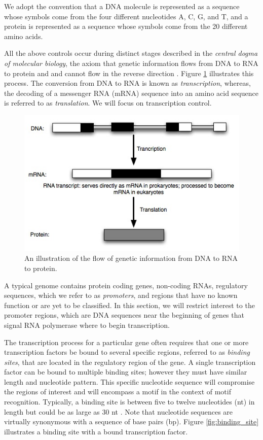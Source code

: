We adopt the convention that a DNA molecule is represented as a sequence whose symbols come from the four different nucleotides A, C, G, and T, and a protein is represented as a sequence whose symbols come from the 20 different amino acids. 
  
All the above controls occur during distinct stages described in the {\em central dogma of molecular biology}, the axiom that genetic information flows from DNA to RNA to protein and and cannot flow in the reverse direction \cite{crick}.  Figure \ref{fig:central_dogma} illustrates this process. The conversion from DNA to RNA is known as {\em transcription}, whereas, the decoding of a messenger RNA (mRNA) sequence into an amino acid sequence is referred to as {\em translation}.  We will focus on transcription control.  

\begin{figure}[h!]
\begin{center}
 \includegraphics[width=\linewidth]{images/central_dogma}
\caption{An illustration of the flow of genetic information from DNA to RNA to protein. }
\label{fig:central_dogma}
\end{center}
\end{figure}

A typical genome contains protein coding genes, non-coding RNAs, regulatory sequences, which we refer to as {\em promoters}, and regions that have no known function or are yet to be classified. In this section, we will restrict interest to the promoter regions, which are DNA sequences near the beginning of genes that signal RNA polymerase where to begin transcription.  

The transcription process for a particular gene often requires that one or more transcription factors be bound to several specific regions, referred to as {\em binding sites}, that are located in the regulatory region of the gene.  A single transcription factor can be bound to multiple binding sites; however they must have similar length and nucleotide pattern.  This specific nucleotide sequence will compromise the regions of interest and will encompass a motif in the context of motif recognition. Typically, a binding site is between five to twelve nucleotides (nt) in length but could be as large as 30 nt \cite{BB05}.  Note that nucleotide sequences are virtually synonymous with a sequence of base pairs (bp). Figure \ref{fig:binding_site} illustrates a binding site with a bound transcription factor. 

